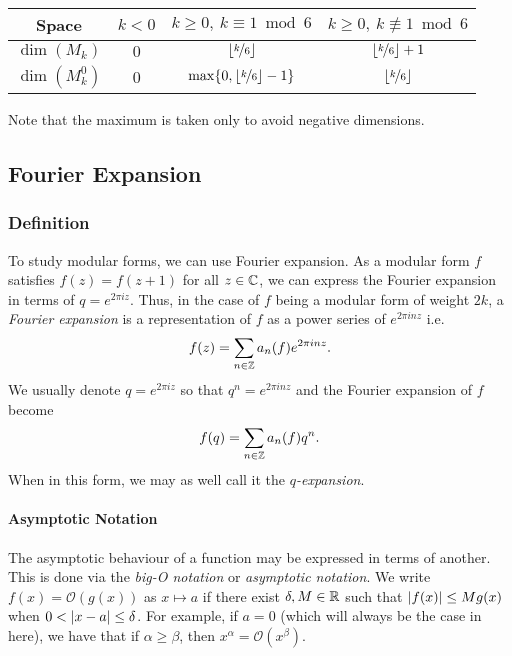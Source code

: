 \begin{center}
\begin{tabular}{||c||c|c|c||} 
    \hline
    Space & $k<0$ & $k \geq 0, \ k \equiv 1 \bmod 6$ & $k \geq 0, \ k \not \equiv 1 \bmod 6$ \\
    \hline
    \hline
    $\dim(M_k)$ & $0$ & $\lfloor \nicefrac{k}{6} \rfloor$ & $\lfloor \nicefrac{k}{6} \rfloor + 1$ \\
    \hline
    $\dim(M_k^0)$ & $0$ & $\max\{0, \lfloor \nicefrac{k}{6} \rfloor - 1\}$ & $\lfloor \nicefrac{k}{6} \rfloor$ \\
    \hline
\end{tabular}
\end{center}
Note that the maximum is taken only to avoid negative dimensions.



\subsection{Fourier Expansion}
\subsubsection{Definition}
To study modular forms, we can use Fourier expansion.
As a modular form $f$ satisfies $f(z) = f(z+1)$ for all $z \in \mathbb{C}$, we can express the Fourier expansion in terms of $q = e^{2 \pi i z}$.
Thus, in the case of $f$ being a modular form of weight $2k$, 
a \textit{Fourier expansion} is a representation of $f$ as a power series of $e^{2\pi i n z}$
i.e. $$f(z) = \sum_{n \in \mathbb{Z}} a_n(f) e^{2\pi inz}.$$
We usually denote $q = e^{2\pi i z}$ so that $q^n = e^{2\pi i n z}$ 
and the Fourier expansion of $f$ become 
$$
f(q) = \sum_{n \in \mathbb{Z}} a_n(f) q^n.
$$
When in this form, we may as well call it the \textit{$q$-expansion}.

\paragraph{Asymptotic Notation}
The asymptotic behaviour of a function may be expressed in terms of another.
This is done via the \textit{big-O notation} or \textit{asymptotic notation}.
We write $f(x) = \mathcal{O}(g(x))$ as $x \mapsto a$ if there exist $\delta, M \in \mathbb{R}$ such that $| f(x) | \leq Mg(x)$ when $0 < | x-a | \leq \delta$.
For example, if $a=0$ (which will always be the case in here), we have that if $\alpha \geq \beta$, then $x^{\alpha} = \mathcal{O}(x^{\beta})$.


